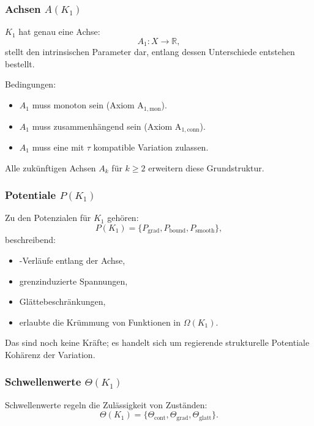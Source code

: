 \subsubsection{Achsen \texorpdfstring{$A(K_1)$}{A(K_1)}}

$K_1$ hat genau eine Achse:
\[
A_1 : X \to \mathbb{R},
\]
stellt den intrinsischen Parameter dar, entlang dessen Unterschiede entstehen
bestellt.

Bedingungen:
\begin{itemize}
    \item $A_1$ muss monoton sein (Axiom A$_{1,\text{mon}}$).
    \item $A_1$ muss zusammenhängend sein (Axiom A$_{1,\text{conn}}$).
    \item $A_1$ muss eine mit $\tau$ kompatible Variation zulassen.
\end{itemize}

Alle zukünftigen Achsen $A_k$ für $k \ge 2$ erweitern diese Grundstruktur.

\subsubsection{Potentiale \texorpdfstring{$P(K_1)$}{P(K_1)}}

Zu den Potenzialen für $K_1$ gehören:
\[
P(K_1) = \{ P_{\mathrm{grad}}, P_{\mathrm{bound}}, P_{\mathrm{smooth}} \},
\]
beschreibend:
\begin{itemize}
    \item-Verläufe entlang der Achse,
    \item grenzinduzierte Spannungen,
    \item Glättebeschränkungen,
    \item erlaubte die Krümmung von Funktionen in $\Omega(K_1)$.
\end{itemize}

Das sind noch keine Kräfte; es handelt sich um regierende strukturelle Potentiale
Kohärenz der Variation.

\subsubsection{Schwellenwerte \texorpdfstring{$\Theta(K_1)$}{\Theta(K_1)}}

Schwellenwerte regeln die Zulässigkeit von Zuständen:
\[
\Theta(K_1) = \{ \Theta_{\mathrm{cont}}, \Theta_{\mathrm{grad}},
                 \Theta_{\mathrm{glatt}} \}.
\]

